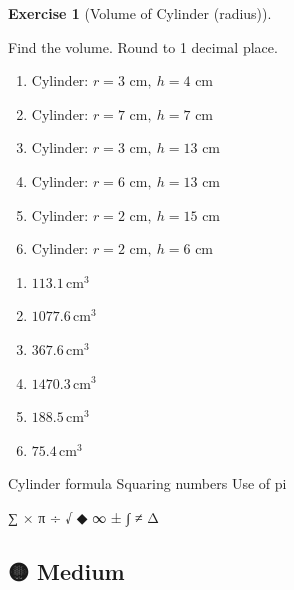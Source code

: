 \documentclass[
  letterpaper,
  DIV=11,
  numbers=noendperiod]{scrreprt}
\theoremstyle{definition}
\newtheorem{exercise}{Exercise}[chapter]
\theoremstyle{remark}
\begin{document}
\begin{exercise}[Volume of Cylinder
(radius)]\protect\hypertarget{exr-vol-6}{}\label{exr-vol-6}

Find the volume. Round to 1 decimal place.

\begin{enumerate}
\def\labelenumi{\alph{enumi})}
\item
  \(\text{Cylinder: }r=3\text{ cm},\ h=4\text{ cm}\)
\item
  \(\text{Cylinder: }r=7\text{ cm},\ h=7\text{ cm}\)
\item
  \(\text{Cylinder: }r=3\text{ cm},\ h=13\text{ cm}\)
\item
  \(\text{Cylinder: }r=6\text{ cm},\ h=13\text{ cm}\)
\item
  \(\text{Cylinder: }r=2\text{ cm},\ h=15\text{ cm}\)
\item
  \(\text{Cylinder: }r=2\text{ cm},\ h=6\text{ cm}\)
\end{enumerate}

\begin{tcolorbox}[enhanced jigsaw, opacitybacktitle=0.6, coltitle=black, arc=.35mm, colframe=quarto-callout-tip-color-frame, colback=white, bottomrule=.15mm, left=2mm, colbacktitle=quarto-callout-tip-color!10!white, titlerule=0mm, opacityback=0, title=\textcolor{quarto-callout-tip-color}{\faLightbulb}\hspace{0.5em}{🔍 View Solution}, leftrule=.75mm, breakable, rightrule=.15mm, bottomtitle=1mm, toptitle=1mm, toprule=.15mm]

\begin{enumerate}
\def\labelenumi{\alph{enumi})}
\item
  \(113.1\,\text{cm}^{3}\)
\item
  \(1077.6\,\text{cm}^{3}\)
\item
  \(367.6\,\text{cm}^{3}\)
\item
  \(1470.3\,\text{cm}^{3}\)
\item
  \(188.5\,\text{cm}^{3}\)
\item
  \(75.4\,\text{cm}^{3}\)
\end{enumerate}

\end{tcolorbox}

{Cylinder formula} {Squaring numbers} {Use of pi}

\end{exercise}

∑ × π ÷ √ ◆ ∞ ± ∫ ≠ Δ

\subsection{🟡 Medium}
\end{document}
